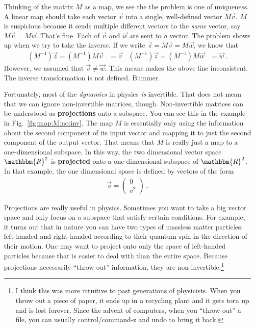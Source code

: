 \documentclass[12pt]{article}
\begin{document}
% 
Thinking of the matrix $M$ as a map, we see the the problem is one of uniqueness. A linear map should take each vector $\vec{v}$ into a single, well-defined vector $M\vec{v}$. $M$ is suspicious because it sends multiple different vectors to the \emph{same} vector, say $M\vec{v} = M\vec{w}$. That's fine. Each of $\vec{v}$ and $\vec{w}$ are sent to \emph{a} vector. The problem shows up when we try to take the inverse. If we write $\vec{z} = M\vec{v} = M\vec{w}$, we know that
\begin{align}
    (M^{-1})\vec{z} = (M^{-1})M\vec{v} &= \vec{v}
    &
    (M^{-1})\vec{z} = (M^{-1})M\vec{w} &= \vec{w} \ .
\end{align}
However, we assumed that $\vec{v} \neq \vec{w}$. This means makes the above line inconsistent. The inverse transformation is not defined. Bummer.

Fortunately, most of the \emph{dynamics} in physics \emph{is} invertible. That does not mean that we can ignore non-invertible matrices, though. Non-invertible matrices can be understood as \textbf{projections} onto a subspace. You can see this in the example in Fig.~\ref{fig:map:M:no:inv}. The map $M$ is essentially only using the information about the second component of its input vector and mapping it to just the second component of the output vector. That means that $M$ is really just a map to a one-dimensional subspace. In this way, the two dimensional vector space $\mathbbm{R}^2$ is \textbf{projected} onto a one-dimensional subspace of $\mathbbm{R}^2$. In that example, the one dimensional space is defined by vectors of the form
\begin{align}
    \vec{v} = 
    \begin{pmatrix}
    0\\ v^2    
    \end{pmatrix} \ .
\end{align}

Projections are really useful in physics. Sometimes you want to take a big vector space and only focus on a subspace that satisfy certain conditions. For example, it turns out that in nature you can have two types of massless matter particles: left-handed and right-handed according to their quantum spin in the direction of their motion. One may want to project onto only the space of left-handed particles because that is easier to deal with than the entire space. Because projections necessarily ``throw out'' information, they are non-invertible.\footnote{I think this was more intuitive to past generations of physicists. When you throw out a piece of paper, it ends up in a recycling plant and it gets torn up and is lost forever. Since the advent of computers, when you ``throw out'' a file, you can usually control/command-z and undo to bring it back.}
\end{document}
